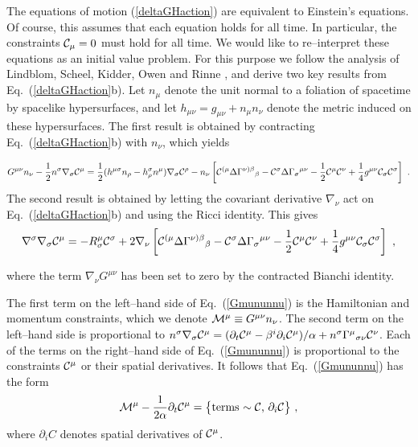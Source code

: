 \documentclass[letterpaper,nofootinbib,prd,amsmath,twocolumn]{revtex4-1}
\begin{document}
The equations of motion (\ref{deltaGHaction}) are equivalent to 
Einstein's equations. Of course, this assumes that each equation holds for all time. In particular, 
the constraints ${\cal C}_\mu = 0$ must hold for all time. We would like to re--interpret these equations 
as an initial value problem. For this purpose we follow the analysis of Lindblom, Scheel, Kidder, Owen  and 
Rinne \cite{Lindblom:2005qh}, 
and derive two key results from
Eq.~(\ref{deltaGHaction}b). Let $n_\mu$ denote the unit normal to a foliation of spacetime by spacelike hypersurfaces, 
and let $h_{\mu\nu} = g_{\mu\nu} + n_\mu n_\nu$ denote the metric induced on these hypersurfaces. 
The first result is obtained by contracting Eq.~(\ref{deltaGHaction}b) with $n_\nu$, which  yields
\begin{widetext}
\begin{equation}\label{Gmununnu}
	 G^{\mu\nu}n_\nu - \frac{1}{2} n^\sigma\nabla_\sigma {\cal C}^\mu 
	= \frac{1}{2} ( h^{\mu\sigma} n_\rho - h^\sigma_\rho n^\mu)\nabla_\sigma {\cal C}^\rho
	-  n_\nu \left[ {\cal C}^{(\mu}\Delta\Gamma^{\nu)\beta}{}_\beta - {\cal C}^\sigma \Delta\Gamma_\sigma{}^{\mu\nu} 
	- \frac{1}{2} {\cal C}^\mu {\cal C}^\nu + \frac{1}{4} g^{\mu\nu} {\cal C}_\sigma {\cal C}^\sigma \right] \ .
\end{equation}
The second result is obtained by letting the covariant derivative $\nabla_\nu$ act on 
Eq.~(\ref{deltaGHaction}b) and using the Ricci identity. This gives
\begin{equation}\label{nablanuGmunu}
	\nabla^\sigma \nabla_\sigma {\cal C}^\mu = -R^\mu_\sigma {\cal C}^\sigma 
	+ 2\nabla_\nu \left[ {\cal C}^{(\mu}\Delta\Gamma^{\nu)\beta}{}_\beta - {\cal C}^\sigma \Delta\Gamma_\sigma{}^{\mu\nu} 
	- \frac{1}{2} {\cal C}^\mu {\cal C}^\nu + \frac{1}{4} g^{\mu\nu} {\cal C}_\sigma {\cal C}^\sigma \right] \ ,
\end{equation}
\end{widetext}
where the term $\nabla_\nu G^{\mu\nu}$ has been set to zero by the contracted Bianchi identity. 

The first term on the left--hand side of Eq.~(\ref{Gmununnu})  
is the Hamiltonian and momentum constraints, which we denote 
${\cal M}^\mu \equiv G^{\mu\nu} n_\nu $. The second term on the left--hand side is proportional to 
$n^\sigma\nabla_\sigma {\cal C}^\mu = (\partial_t {\cal C}^\mu - \beta^i \partial_i {\cal C}^\mu)/\alpha 
+ n^\sigma \Gamma^\mu{}_{\sigma\nu} {\cal C}^\nu$. Each of the terms on the right--hand side of Eq.~(\ref{Gmununnu})  
is proportional to the constraints ${\cal C}^\mu$ or their spatial derivatives. 
It follows that Eq.~(\ref{Gmununnu}) has the form
\begin{equation}\label{Gmununnu2}
	{\cal M}^\mu - \frac{1}{2\alpha} \partial_t {\cal C}^\mu =  
	\bigl\{ {\hbox{terms $\sim {\cal C}$, $\partial_i {\cal C}$}} \bigr\} \ ,
\end{equation}
where $\partial_i C$ denotes spatial derivatives of ${\cal C}^\mu$. 
\end{document}

